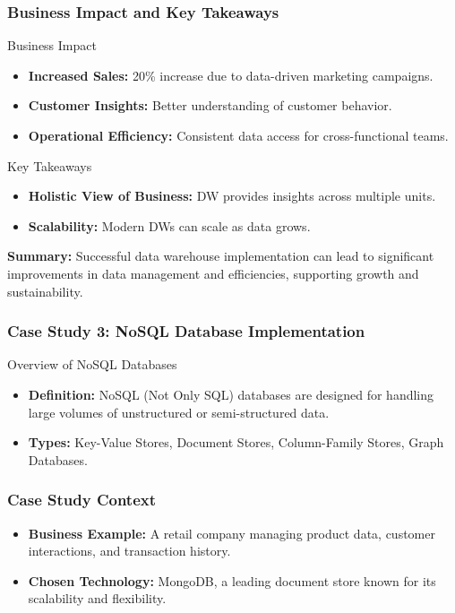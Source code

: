 \documentclass[aspectratio=169]{beamer}
\begin{document}
\begin{frame}[fragile]
    \frametitle{Business Impact and Key Takeaways}
    \begin{block}{Business Impact}
        \begin{itemize}
            \item \textbf{Increased Sales:} 20\% increase due to data-driven marketing campaigns.
            \item \textbf{Customer Insights:} Better understanding of customer behavior.
            \item \textbf{Operational Efficiency:} Consistent data access for cross-functional teams.
        \end{itemize}
    \end{block}

    \begin{block}{Key Takeaways}
        \begin{itemize}
            \item \textbf{Holistic View of Business:} DW provides insights across multiple units.
            \item \textbf{Scalability:} Modern DWs can scale as data grows.
        \end{itemize}
    \end{block}

    \textbf{Summary:} Successful data warehouse implementation can lead to significant improvements in data management and efficiencies, supporting growth and sustainability.
\end{frame}

\begin{frame}[fragile]
    \frametitle{Case Study 3: NoSQL Database Implementation}
    \begin{block}{Overview of NoSQL Databases}
        \begin{itemize}
            \item \textbf{Definition:} NoSQL (Not Only SQL) databases are designed for handling large volumes of unstructured or semi-structured data.
            \item \textbf{Types:} Key-Value Stores, Document Stores, Column-Family Stores, Graph Databases.
        \end{itemize}
    \end{block}
\end{frame}

\begin{frame}[fragile]
    \frametitle{Case Study Context}
    \begin{itemize}
        \item \textbf{Business Example:} A retail company managing product data, customer interactions, and transaction history.
        \item \textbf{Chosen Technology:} MongoDB, a leading document store known for its scalability and flexibility.
    \end{itemize}
\end{frame}
\end{document}
